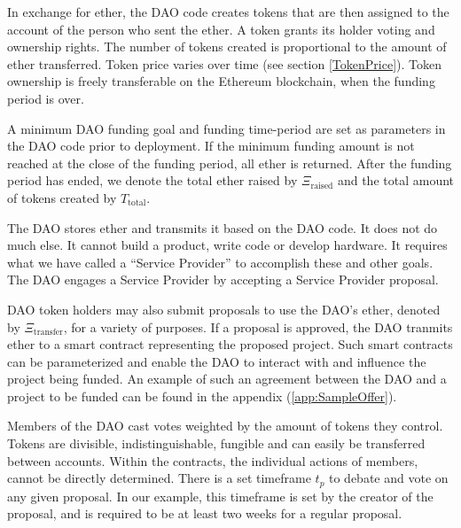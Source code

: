 \documentclass[9pt,oneside]{amsart}
\begin{document}
\begin{multicols}{2}
In exchange for ether, the DAO code creates tokens that are then assigned to the account of the person who sent the ether. A token grants its holder voting and ownership rights. The number of tokens created is proportional to the amount of ether transferred. Token price varies over time (see section \ref{TokenPrice}). Token ownership is freely transferable on the Ethereum blockchain, when the funding period is over.

A minimum DAO funding goal and funding time-period are set as parameters in the DAO code prior to deployment. If the minimum funding amount is not reached at the close of the funding period, all ether is returned. After the funding period has ended, we denote the total ether raised by $\Xi_{\text{raised}}$ and the total amount of tokens created by $T_{\text{total}}$. 

The DAO stores ether and transmits it based on the DAO code. It does not do much else. It cannot build a product, write code or develop hardware. It requires what we have called a ``Service Provider'' to accomplish these and other goals. The DAO engages a Service Provider by accepting a Service Provider proposal. 

DAO token holders may also submit proposals to use the DAO's ether, denoted by $\Xi_{\text{transfer}}$, for a variety of purposes. If a proposal is approved, the DAO tranmits ether to a smart contract representing the proposed project. Such smart contracts can be parameterized and enable the DAO to interact with and influence the project being funded.
An example of such an agreement between the DAO and a project to be funded can be found in the appendix (\ref{app:SampleOffer}).

Members of the DAO cast votes weighted by the amount of tokens they control. Tokens are divisible, indistinguishable, fungible and can easily be transferred between accounts. Within the contracts, the individual actions of members, cannot be directly determined. There is a set timeframe $t_p$ to debate and vote on any given proposal. In our example, this timeframe is set by the creator of the proposal, and is required to be at least two weeks for a regular proposal.


\end{multicols}
\end{document}
